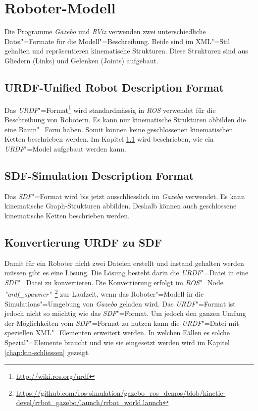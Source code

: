 

\section{Roboter-Modell} %
\label{chap:roboter-modell}

Die Programme \textit{Gazebo} und \textit{RViz} verwenden zwei unterschiedliche Datei"=Formate für die Modell"=Beschreibung.
Beide sind im XML"=Stil gehalten und repräsentieren kinematische Strukturen.
Diese Strukturen sind aus Gliedern (Links) und Gelenken (Joints) aufgebaut.

\subsection{URDF-Unified Robot Description Format}
\label{chap:urdf}
Das \textit{URDF}"=Format\footnote{\url{http://wiki.ros.org/urdf}} wird standardmässig in \textit{ROS} verwendet für die Beschreibung von Robotern.
Es kann nur kinematische Strukturen abbilden die eine Baum"=Form haben.
Somit können keine geschlossenen kinematischen Ketten beschrieben werden.
Im Kapitel \ref{chap:urdf} wird beschrieben, wie ein \textit{URDF}"=Model aufgebaut werden kann.

\subsection{SDF-Simulation Description Format}
\label{chap:sdf}
Das \textit{SDF}"=Format wird bis jetzt ausschliesslich im \textit{Gazebo} verwendet.
Es kann kinematische Graph-Strukturen abbilden.
Deshalb können auch geschlossene kinematische Ketten beschrieben werden.

\subsection{Konvertierung URDF zu SDF}
\label{chap:konvertierung}
Damit für ein Roboter nicht zwei Dateien erstellt und instand gehalten werden müssen gibt es eine Lösung.
Die Lösung besteht darin die \textit{URDF}"=Datei in eine \textit{SDF}"=Datei zu konvertieren.
Die Konvertierung erfolgt im \textit{ROS}"=Node \textit{\textit{"}urdf\_spawner"}~\footnote{\url{https://github.com/ros-simulation/gazebo\_ros\_demos/blob/kinetic-devel/rrbot\_gazebo/launch/rrbot\_world.launch}} zur Laufzeit, wenn das Roboter"=Modell in die Simulations"=Umgebung von \textit{Gazebo} geladen wird.
Das \textit{URDF}"=Format ist jedoch nicht so mächtig wie das \textit{SDF}"=Format.
Um jedoch den ganzen Umfang der Möglichkeiten vom \textit{SDF}"=Format zu nutzen kann die \textit{URDF}"=Datei mit speziellen XML"=Elementen erweitert werden.
In welchen Fällen es solche Spezial"=Elemente braucht und wie sie eingesetzt werden wird im Kapitel \ref{chap:kin-schliessen} gezeigt. 

